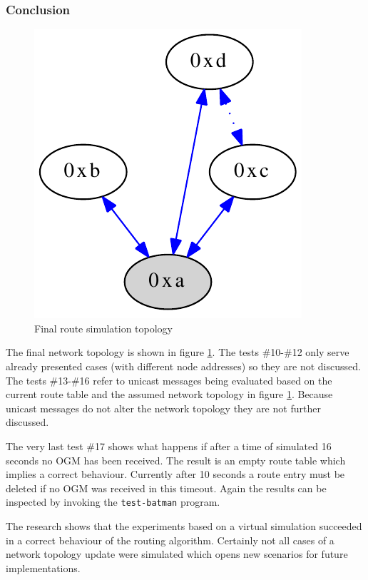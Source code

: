 \subsubsection{Conclusion}%
\begin{figure}[H]
  \begin{center}
    \includegraphics[]{figures/testfinal}
  \end{center}
  \caption{Final route simulation topology}
  \label{fig:testfinal}
\end{figure}

The final network topology is shown in figure \ref{fig:testfinal}. The tests \#10-\#12 only serve already presented cases (with different node addresses) so they are not discussed. The tests \#13-\#16 refer to unicast messages being evaluated based on the current route table and the assumed network topology in figure \ref{fig:testfinal}. Because unicast messages do not alter the network topology they are not further discussed.

The very last test \#17 shows what happens if after a time of simulated 16 seconds no OGM has been received. The result is an empty route table which implies a correct behaviour. Currently after 10 seconds a route entry must be deleted if no OGM was received in this timeout. Again the results can be inspected by invoking the \texttt{test-batman} program.

The research shows that the experiments based on a virtual simulation succeeded in a correct behaviour of the routing algorithm. Certainly not all cases of a network topology update were simulated which opens new scenarios for future implementations.

